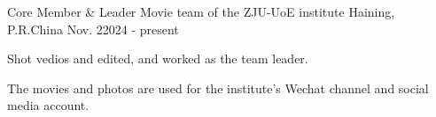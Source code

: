 

\begin{cventries}


  \cventry
    {Core Member \& Leader} %
    {Movie team of the ZJU-UoE institute} %
    {Haining, P.R.China} %
    {Nov. 22024 - present} %
    {
      \begin{cvitems} %
        \item {Shot vedios and edited, and worked as the team leader.}
        \item {The movies and photos are used for the institute's Wechat channel and social media account.}
      \end{cvitems}
    }


\end{cventries}
